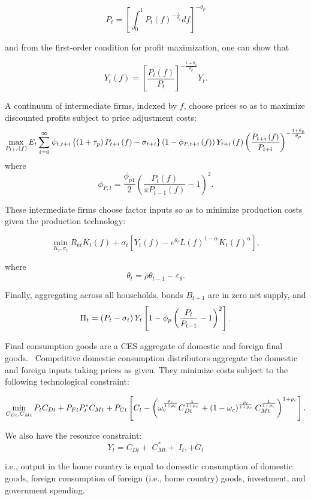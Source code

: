 \documentclass{article}
\begin{document}
\[
P_{t}=\left[ \int_{0}^{1}P_{t}(f)^{-\frac{1}{\theta _{p}}}df\right]
^{-\theta _{p}} 
\]

and from the first-order condition for profit maximization, one can show that

\[
Y_{t}(f)=\left[ \frac{P_{t}(f)}{P_{t}}\right] ^{-\frac{1+\theta _{p}}{\theta
_{p}}}Y_{t}. 
\]

A continuum of intermediate firms, indexed by $f$, choose prices so as to
maximize discounted profits subject to price adjustment costs:%
\[
\max_{P_{t+i}\left( f\right) }E_{t}\sum_{i=0}^{\infty }\psi _{t,t+i}\left\{
\left( 1+\tau _{p}\right) P_{t+i}\left( f\right) -\sigma _{t+i}\right\}
\left( 1-\phi _{P,t+i}\left( f\right) \right) Y_{t+i}\left( f\right) \left( 
\frac{P_{t+i}\left( f\right) }{P_{t+i}}\right) ^{-\frac{1+\theta _{p}}{%
\theta _{p}}} 
\]%
where%
\[
\phi _{P,t}=\frac{\phi _{p1}}{2}\left( \frac{P_{t}\left( f\right) }{\pi
P_{t-1}\left( f\right) }-1\right) ^{2}. 
\]

\bigskip

These intermediate firms choose factor inputs so as to minimize production
costs given the production technology:

\[
\min_{K_{t},\sigma _{t}}R_{kt}K_{t}(f)+\sigma _{t}\left[ Y_{t}(f)-e^{\theta
_{t}}L(f)^{1-\alpha }K_{t}(f)^{\alpha }\right] , 
\]

where 
\[
\theta _{t}=\rho \theta _{t-1}-\varepsilon _{\theta }. 
\]

\bigskip Finally, aggregating across all households, bonds $B_{t+1}$ are in
zero net supply, and 
\[
\Pi _{t}=\left( P_{t}-\sigma _{t}\right) Y_{t}\left[ 1-\phi _{p}\left( \frac{%
P_{t}}{P_{t-1}}-1\right) ^{2}\right] . 
\]

Final consumption goods are a CES aggregate of domestic and foreign final
goods. \ Competitive domestic consumption distributors aggregate the
domestic and foreign inputs taking prices as given. They minimize costs
subject to the following technological constraint:

\bigskip

\[
\min_{C_{Dt},C_{Mt}}P_{t}C_{Dt}+P_{Ft}P_{t}^{\ast }C_{Mt}+P_{Ct}\left[
C_{t}-\left( \omega _{c}^{\frac{\rho _{c}}{1+\rho _{c}}}C_{Dt}^{\frac{1}{%
1+\rho _{c}}}+\left( 1-\omega _{c}\right) ^{\frac{\rho _{c}}{1+\rho _{c}}%
}C_{Mt}^{\frac{1}{1+\rho _{c}}}\right) ^{1+\rho _{c}}\right] . 
\]

We also have the resource constraint:\ \bigskip 
\[
Y_{t}=C_{Dt}+\ C_{Mt}^{\ast }+\ I_{t},+G_{t} 
\]

i.e., output in the home country is equal to domestic consumption of
domestic goods, foreign consumption of foreign (i.e., home country) goods,
investment, and government spending.
\end{document}
